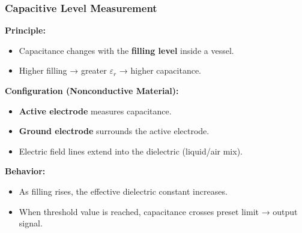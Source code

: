 \begin{frame}
	\frametitle{Capacitive Level Measurement}
    \textbf{Principle:}
    \begin{itemize}
        \item Capacitance changes with the \textbf{filling level} inside a vessel.
        \item Higher filling → greater $\varepsilon_r$ → higher capacitance.
    \end{itemize}
    \textbf{Configuration (Nonconductive Material):}
    \begin{itemize}
        \item \textbf{Active electrode} measures capacitance.
        \item \textbf{Ground electrode} surrounds the active electrode.
        \item Electric field lines extend into the dielectric (liquid/air mix).
    \end{itemize}
    \textbf{Behavior:}
    \begin{itemize}
        \item As filling rises, the effective dielectric constant increases.
        \item When threshold value is reached, capacitance crosses preset limit → output signal.
    \end{itemize}
\end{frame}

